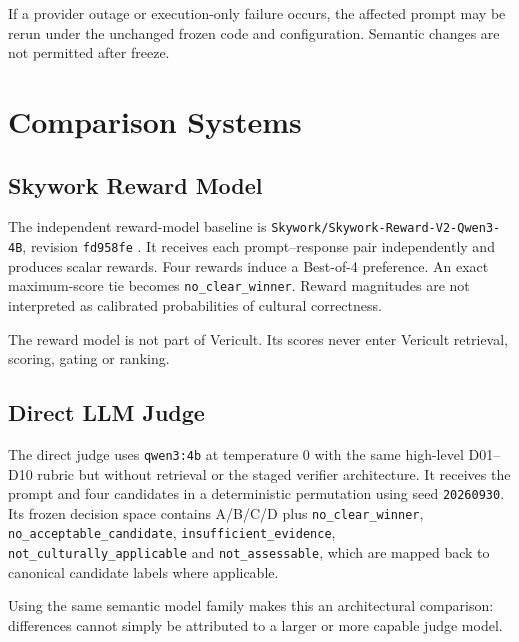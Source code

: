 If a provider outage or execution-only failure occurs, the affected prompt may be rerun under the unchanged frozen code and configuration. Semantic changes are not permitted after freeze.

\section{Comparison Systems}

\subsection{Skywork Reward Model}

The independent reward-model baseline is \texttt{Skywork/Skywork-Reward-V2-Qwen3-4B}, revision \texttt{fd958fe} \parencite{liu2026skyworkrewardv2}. It receives each prompt--response pair independently and produces scalar rewards. Four rewards induce a Best-of-4 preference. An exact maximum-score tie becomes \texttt{no\_clear\_winner}. Reward magnitudes are not interpreted as calibrated probabilities of cultural correctness.

The reward model is not part of Vericult. Its scores never enter Vericult retrieval, scoring, gating or ranking.

\subsection{Direct LLM Judge}

The direct judge uses \texttt{qwen3:4b} at temperature 0 with the same high-level D01--D10 rubric but without retrieval or the staged verifier architecture. It receives the prompt and four candidates in a deterministic permutation using seed \texttt{20260930}. Its frozen decision space contains A/B/C/D plus \texttt{no\_clear\_winner}, \texttt{no\_acceptable\_candidate}, \texttt{insufficient\_evidence}, \texttt{not\_culturally\_applicable} and \texttt{not\_assessable}, which are mapped back to canonical candidate labels where applicable.

Using the same semantic model family makes this an architectural comparison: differences cannot simply be attributed to a larger or more capable judge model.

